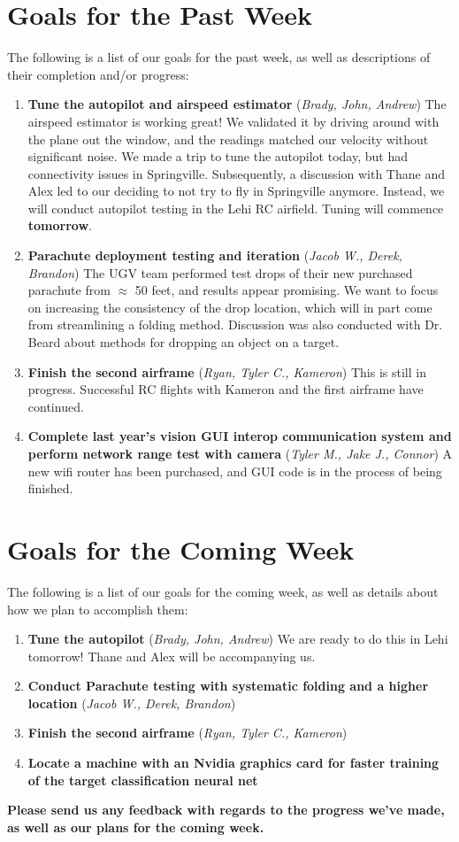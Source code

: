\documentclass[]{../auvsi_doc}
\begin{document}
\section{Goals for the Past Week}

The following is a list of our goals for the past week, as well as descriptions of their completion and/or progress:

\begin{enumerate}
	\item \textbf{Tune the autopilot and airspeed estimator} (\textit{Brady, John, Andrew})
	The airspeed estimator is working great! We validated it by driving around with the plane out the window, and the readings matched our velocity without significant noise. We made a trip to tune the autopilot today, but had connectivity issues in Springville. Subsequently, a discussion with Thane and Alex led to our deciding to not try to fly in Springville anymore. Instead, we will conduct autopilot testing in the Lehi RC airfield. Tuning will commence \textbf{tomorrow}.
	\item \textbf{Parachute deployment testing and iteration} (\textit{Jacob W., Derek, Brandon})
	The UGV team performed test drops of their new purchased parachute from $\approx$ 50 feet, and results appear promising. We want to focus on increasing the consistency of the drop location, which will in part come from streamlining a folding method. Discussion was also conducted with Dr. Beard about methods for dropping an object on a target.
	\item \textbf{Finish the second airframe} (\textit{Ryan, Tyler C., Kameron})
	This is still in progress. Successful RC flights with Kameron and the first airframe have continued.
	\item \textbf{Complete last year's vision GUI interop communication system and perform network range test with camera} (\textit{Tyler M., Jake J., Connor})
	A new wifi router has been purchased, and GUI code is in the process of being finished.
\end{enumerate}

\section{Goals for the Coming Week}

The following is a list of our goals for the coming week, as well as details about how we plan to accomplish them:

\begin{enumerate}
	\item \textbf{Tune the autopilot} (\textit{Brady, John, Andrew})
	We are ready to do this in Lehi tomorrow! Thane and Alex will be accompanying us.
	\item \textbf{Conduct Parachute testing with systematic folding and a higher location} (\textit{Jacob W., Derek, Brandon})
	\item \textbf{Finish the second airframe} (\textit{Ryan, Tyler C., Kameron})
	\item \textbf{Locate a machine with an Nvidia graphics card for faster training of the target classification neural net}
\end{enumerate}

\textbf{Please send us any feedback with regards to the progress we've made, as well as our plans for the coming week.}

%
%
%
\end{document}
